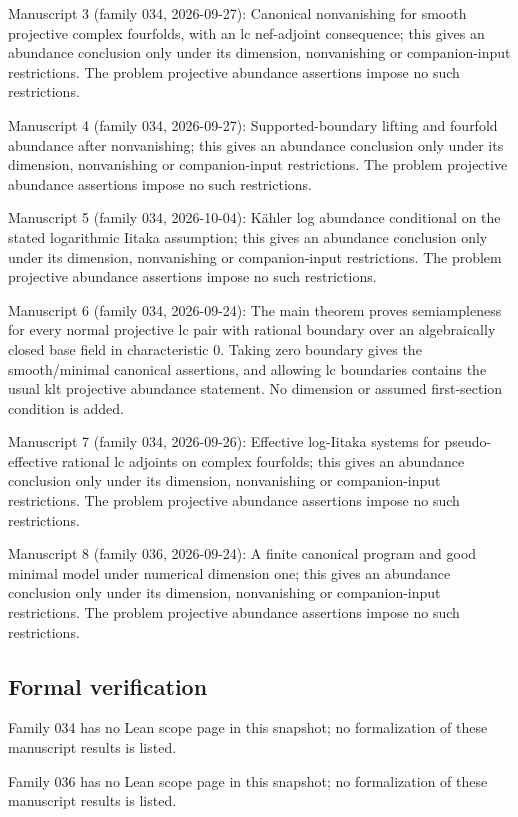 \documentclass[11pt]{article}
\begin{document}
Manuscript 3 (family 034, 2026-09-27): Canonical nonvanishing for smooth projective complex fourfolds, with an lc nef-adjoint consequence; this gives an abundance conclusion only under its dimension, nonvanishing or companion-input restrictions. The problem projective abundance assertions impose no such restrictions.

Manuscript 4 (family 034, 2026-09-27): Supported-boundary lifting and fourfold abundance after nonvanishing; this gives an abundance conclusion only under its dimension, nonvanishing or companion-input restrictions. The problem projective abundance assertions impose no such restrictions.

Manuscript 5 (family 034, 2026-10-04): Kähler log abundance conditional on the stated logarithmic Iitaka assumption; this gives an abundance conclusion only under its dimension, nonvanishing or companion-input restrictions. The problem projective abundance assertions impose no such restrictions.

Manuscript 6 (family 034, 2026-09-24): The main theorem proves semiampleness for every normal projective lc pair with rational boundary over an algebraically closed base field in characteristic $0$. Taking zero boundary gives the smooth/minimal canonical assertions, and allowing lc boundaries contains the usual klt projective abundance statement. No dimension or assumed first-section condition is added.

Manuscript 7 (family 034, 2026-09-26): Effective log-Iitaka systems for pseudo-effective rational lc adjoints on complex fourfolds; this gives an abundance conclusion only under its dimension, nonvanishing or companion-input restrictions. The problem projective abundance assertions impose no such restrictions.

Manuscript 8 (family 036, 2026-09-24): A finite canonical program and good minimal model under numerical dimension one; this gives an abundance conclusion only under its dimension, nonvanishing or companion-input restrictions. The problem projective abundance assertions impose no such restrictions.

\subsection{Formal verification}
Family 034 has no Lean scope page in this snapshot; no formalization of these manuscript results is listed.

Family 036 has no Lean scope page in this snapshot; no formalization of these manuscript results is listed.
\end{document}
